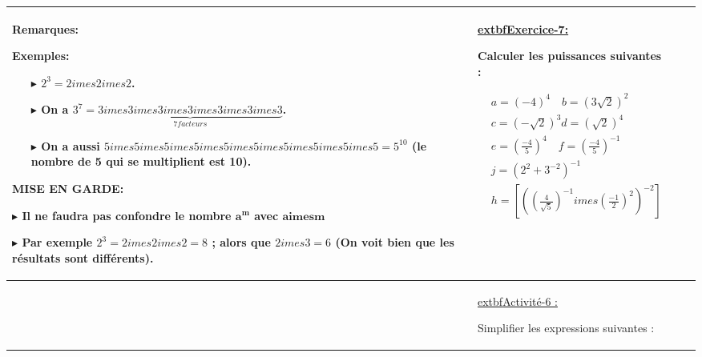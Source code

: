 \documentclass[11pt,a4paper,landscape]{article}
\begin{document}
\begin{longtable}{|>{\centering\arraybackslash}p{3cm}|>{\raggedright\arraybackslash}p{5cm}|>{\raggedright\arraybackslash}p{13.5cm}|>{\raggedright\arraybackslash}p{5cm}|}
\begin{BoxRafa}[colbacktitle = Orange]{Remarques:}
\end{BoxRafa}
\begin{BoxRafa}[colbacktitle = Orange]{Exemples:}

\begin{itemize}
\item[$\blacktriangleright$]  $2^{3}=2imes2imes2$.
\item[$\blacktriangleright$]  On a $3^7=\underbrace{3imes3imes3imes3imes3imes3imes3}_{7facteurs}$.
\item[$\blacktriangleright$]  On a aussi $5imes5imes5imes5imes5imes5imes5imes5imes5imes5=5^{10}$ (le nombre de 5 qui se multiplient est 10).
\end{itemize}

\end{BoxRafa}
\begin{BoxRafa}[colbacktitle = Orange]{MISE EN GARDE:}

$\blacktriangleright$ Il ne faudra pas confondre le nombre $\mathbf{a^{m}}$ avec $\mathbf{aimes m}$

$\blacktriangleright$ Par exemple $2^{3}=2imes2imes2=8$ ; alors que $2imes3=6$ (On voit bien que les résultats sont différents).


\end{BoxRafa}
&
\colorbox{yellow!50!white}{\uline{\sffamily extbf{Exercice-7:}}}\par
Calculer les puissances suivantes :

$\begin{aligned}
&a=\left(-4\right)^{4}\quad b=\left(3\sqrt{2}\right)^{2} \\
&c=\left(-\sqrt{2}\right)^{3}d=\left(\sqrt{2}\right)^{4} \\
&e=\left({\frac{-4}{5}}\right)^{4}\quad f=\left({\frac{-4}{5}}\right)^{-1} \\
&j=(2^{2}+3^{-2})^{-1} \\
&h=\left[((\frac{4}{\sqrt{5}})^{-1}imes(\frac{-1}{2})^{2})^{-2}\right]
\end{aligned}$
\\
\hline
&
\colorbox{yellow!50!white}{\uline{\sffamily extbf{Activité-6 :} }}\par%

Simplifier les expressions suivantes : 


\end{longtable}
\end{document}
